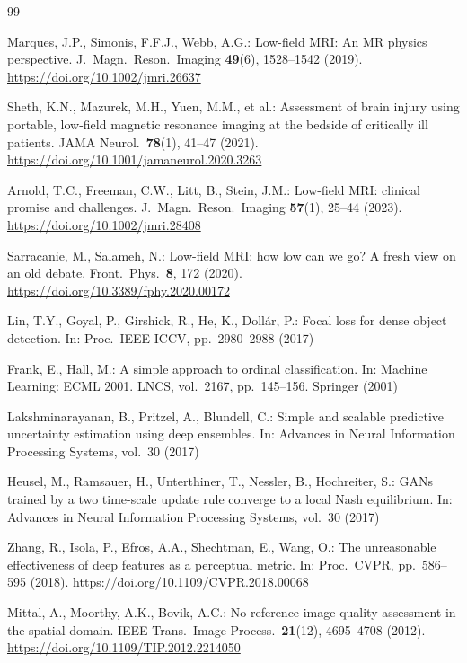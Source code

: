 \documentclass[runningheads]{llncs}
\begin{document}

\begin{thebibliography}{99}

Marques, J.P., Simonis, F.F.J., Webb, A.G.: Low-field MRI: An MR physics
perspective. J.\ Magn.\ Reson.\ Imaging \textbf{49}(6), 1528--1542 (2019).
\url{https://doi.org/10.1002/jmri.26637}

Sheth, K.N., Mazurek, M.H., Yuen, M.M., et al.: Assessment of brain injury using
portable, low-field magnetic resonance imaging at the bedside of critically ill
patients. JAMA Neurol.\ \textbf{78}(1), 41--47 (2021).
\url{https://doi.org/10.1001/jamaneurol.2020.3263}

Arnold, T.C., Freeman, C.W., Litt, B., Stein, J.M.: Low-field MRI: clinical
promise and challenges. J.\ Magn.\ Reson.\ Imaging \textbf{57}(1), 25--44 (2023).
\url{https://doi.org/10.1002/jmri.28408}

Sarracanie, M., Salameh, N.: Low-field MRI: how low can we go? A fresh view on an
old debate. Front.\ Phys.\ \textbf{8}, 172 (2020).
\url{https://doi.org/10.3389/fphy.2020.00172}

Lin, T.Y., Goyal, P., Girshick, R., He, K., Doll{\'a}r, P.: Focal loss for dense
object detection. In: Proc.\ IEEE ICCV, pp.~2980--2988 (2017)

Frank, E., Hall, M.: A simple approach to ordinal classification. In: Machine
Learning: ECML 2001. LNCS, vol.~2167, pp.~145--156. Springer (2001)

Lakshminarayanan, B., Pritzel, A., Blundell, C.: Simple and scalable predictive
uncertainty estimation using deep ensembles. In: Advances in Neural Information
Processing Systems, vol.~30 (2017)

Heusel, M., Ramsauer, H., Unterthiner, T., Nessler, B., Hochreiter, S.: GANs
trained by a two time-scale update rule converge to a local Nash equilibrium. In:
Advances in Neural Information Processing Systems, vol.~30 (2017)

Zhang, R., Isola, P., Efros, A.A., Shechtman, E., Wang, O.: The unreasonable
effectiveness of deep features as a perceptual metric. In: Proc.\ CVPR, pp.\
586--595 (2018). \url{https://doi.org/10.1109/CVPR.2018.00068}

Mittal, A., Moorthy, A.K., Bovik, A.C.: No-reference image quality assessment in
the spatial domain. IEEE Trans.\ Image Process.\ \textbf{21}(12), 4695--4708
(2012). \url{https://doi.org/10.1109/TIP.2012.2214050}


\end{thebibliography}
\end{document}
